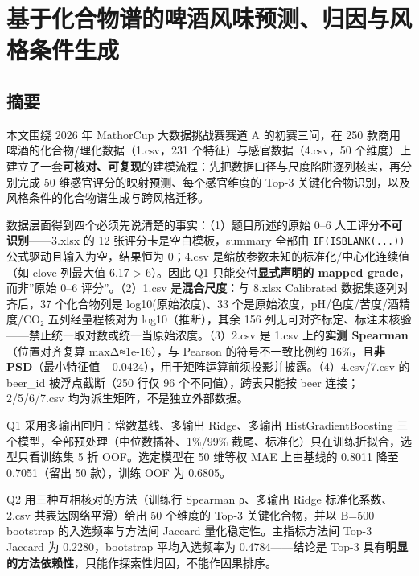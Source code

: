 \documentclass[
  UTF8]{ctexart}
\author{}
\date{}
\begin{document}
\section*{基于化合物谱的啤酒风味预测、归因与风格条件生成}\label{ux57faux4e8eux5316ux5408ux7269ux8c31ux7684ux5564ux9152ux98ceux5473ux9884ux6d4bux5f52ux56e0ux4e0eux98ceux683cux6761ux4ef6ux751fux6210}

\subsection*{摘要}\label{ux6458ux8981}

本文围绕 2026 年 MathorCup 大数据挑战赛赛道 A 的初赛三问，在 250
款商用啤酒的化合物/理化数据（1.csv，231 个特征）与感官数据（4.csv，50
个维度）上建立了一套\textbf{可核对、可复现}的建模流程：先把数据口径与尺度陷阱逐列核实，再分别完成
50 维感官评分的映射预测、每个感官维度的 Top-3
关键化合物识别，以及风格条件的化合物谱生成与跨风格迁移。

数据层面得到四个必须先说清楚的事实：（1）题目所述的原始 0--6
人工评分\textbf{不可识别}------3.xlsx 的 12 张评分卡是空白模板，summary
全部由 \texttt{IF(ISBLANK(...))} 公式驱动且输入为空，结果恒为 0；4.csv
是缩放参数未知的标准化/中心化连续值（如 clove 列最大值 6.17
\textgreater{} 6）。因此 Q1 只能交付\textbf{显式声明的 mapped
grade}，而非''原始 0--6 评分''。（2）1.csv 是\textbf{混合尺度}：与
8.xlsx Calibrated 数据集逐列对齐后，37 个化合物列是 log10(原始浓度)、33
个是原始浓度，pH/色度/苦度/酒精度/CO₂ 五列经量程核对为
log10（推断），其余 156
列无可对齐标定、标注未核验------禁止统一取对数或统一当原始浓度。（3）2.csv
是 1.csv 上的\textbf{实测 Spearman}（位置对齐复算
max\textbar Δ\textbar≈1e-16），与 Pearson 的符号不一致比例约
16\%，且\textbf{非 PSD}（最小特征值
−0.0424），用于矩阵运算前须投影并披露。（4）4.csv/7.csv 的 beer\_id
被浮点截断（250 行仅 96 个不同值），跨表只能按 beer 连接；2/5/6/7.csv
均为派生矩阵，不是独立外部数据。

Q1 采用多输出回归：常数基线、多输出 Ridge、多输出 HistGradientBoosting
三个模型，全部预处理（中位数插补、1\%/99\%
截尾、标准化）只在训练折拟合，选型只看训练集 5 折 OOF。选定模型在 50
维等权 MAE 上由基线的 0.8011 降至 0.7051（留出 50 款），训练 OOF 为
0.6805。

Q2 用三种互相核对的方法（训练行 Spearman \textbar ρ\textbar、多输出
Ridge 标准化系数、2.csv 共表达网络平滑）给出 50 个维度的 Top-3
关键化合物，并以 B=500 bootstrap 的入选频率与方法间 Jaccard
量化稳定性。主指标方法间 Top-3 Jaccard 为 0.2280，bootstrap
平均入选频率为 0.4784------结论是 Top-3
具有\textbf{明显的方法依赖性}，只能作探索性归因，不能作因果排序。
\end{document}
